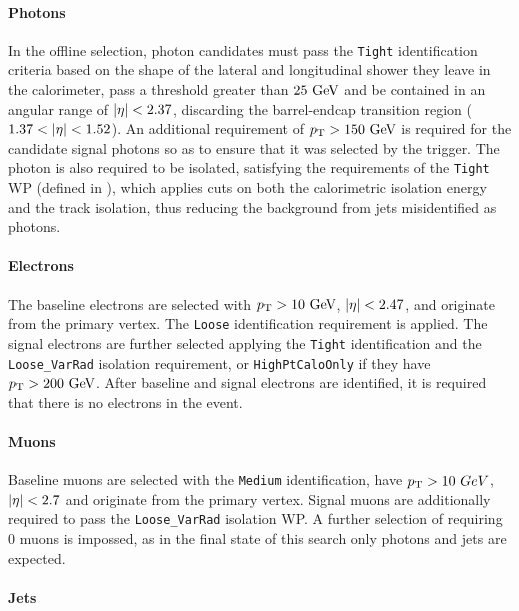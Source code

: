 \paragraph{Photons}

In the offline selection, photon candidates must pass the \texttt{Tight} identification criteria based on the shape of the lateral and longitudinal shower they leave in the calorimeter, pass a \pt threshold greater than \(25~\text{GeV}\) and be contained in an angular range of \(|\eta| < 2.37\), discarding the barrel-endcap transition region (\(1.37 < |\eta| < 1.52\)). An additional requirement of \(p_{\text{T}} > 150~\text{GeV}\) is required for the candidate signal photons so as to ensure that it was selected by the trigger. The photon is also required to be isolated, satisfying the requirements of the \texttt{Tight} \ac{WP} (defined in \Sect{\ref{subsec:objects:egamma:iso}}), which applies cuts on both the calorimetric isolation energy and the track isolation, thus reducing the background from jets misidentified as photons.


\paragraph{Electrons}

The baseline electrons are selected with \(p_{\text{T}} > 10~\text{GeV}\), \(|\eta| < 2.47\), and originate from the primary vertex. The \texttt{Loose} identification requirement is applied. The signal electrons are further selected applying the \texttt{Tight} identification and the \texttt{Loose\_VarRad} isolation requirement, or \texttt{HighPtCaloOnly} if they have \(p_{\text{T}} > 200~\text{GeV}\). After baseline and signal electrons are identified, it is required that there is no electrons in the event.


\paragraph{Muons}
Baseline muons are selected with the \texttt{Medium} identification, have \(p_{\text{T}} > 10~GeV\), \(|\eta| < 2.7\) and originate from the primary vertex. Signal muons are additionally required to pass the \texttt{Loose\_VarRad} isolation \ac{WP}. A further selection of requiring 0 muons is impossed, as in the final state of this search only photons and jets are expected.


\paragraph{Jets}

